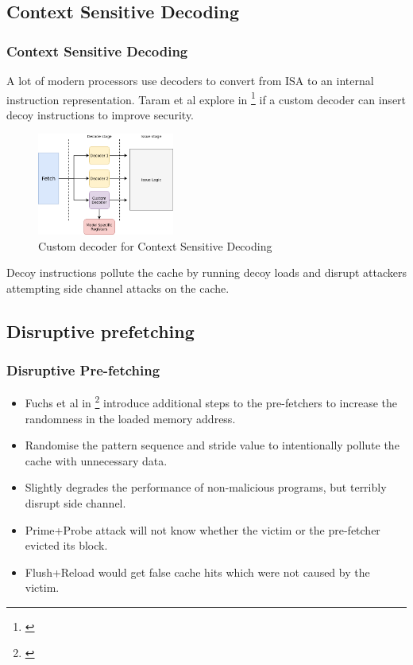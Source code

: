 \documentclass[10pt]{beamer}
\begin{document}
\subsection{Context Sensitive Decoding}
\begin{frame}
\frametitle{Context Sensitive Decoding}
A lot of modern processors use decoders to convert from ISA to an internal instruction
    representation. Taram et al explore in \footnote{\cite{csd}} if a custom decoder can insert decoy
instructions to improve security.
\begin{figure}
\centering
\includegraphics[width=0.4\textwidth]{figures/csd}
\caption{Custom decoder for Context Sensitive Decoding}
\end{figure}
Decoy instructions pollute the cache by running decoy loads and
disrupt attackers attempting side channel attacks on the cache.
\end{frame}

\subsection{Disruptive prefetching}
\begin{frame}
\frametitle{Disruptive Pre-fetching}
\begin{itemize}
    \item Fuchs et al in \footnote{\cite{disruptive_prefetch}} introduce additional steps to the pre-fetchers to increase the randomness
in the loaded memory address.
\item Randomise the pattern sequence and stride value to intentionally pollute the cache with unnecessary data.
\item Slightly degrades the performance of non-malicious programs, but terribly disrupt side channel.
\item Prime+Probe attack will not know whether the victim or the pre-fetcher evicted its block.
\item Flush+Reload would get false cache hits which were not caused by the victim.
\end{itemize}
\end{frame}
\end{document}

